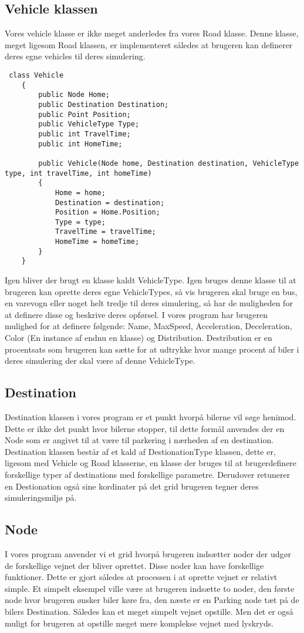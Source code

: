 \subsection{Vehicle klassen}
Vores vehicle klasse er ikke meget anderledes fra vores Road klasse. Denne klasse, meget ligesom Road klassen, er implementeret således at brugeren kan definerer deres egne vehicles til deres simulering.
\begin{lstlisting}
 class Vehicle
    {
        public Node Home;
        public Destination Destination;
        public Point Position;
        public VehicleType Type;
        public int TravelTime;
        public int HomeTime;

        public Vehicle(Node home, Destination destination, VehicleType type, int travelTime, int homeTime)
        {
            Home = home;
            Destination = destination;
            Position = Home.Position;
            Type = type;
            TravelTime = travelTime;
            HomeTime = homeTime;
        }
    }
\end{lstlisting}
Igen bliver der brugt en klasse kaldt VehicleType. Igen bruges denne klasse til at brugeren kan oprette deres egne VehicleTypes, så vis brugeren skal bruge en bus, en varevogn eller noget helt tredje til deres simulering, så har de muligheden for at definere disse og beskrive deres opførsel. I vores program har brugeren mulighed for at definere følgende: Name, MaxSpeed, Acceleration, Deceleration, Color (En instance af endnu en klasse) og Distribution. Destribution er en procentsats som brugeren kan sætte for at udtrykke hvor mange procent af biler i deres simulering der skal være af denne VehicleType.

\subsection{Destination}
Destination klassen i vores program er et punkt hvorpå bilerne vil søge henimod. Dette er ikke det punkt hvor bilerne stopper, til dette formål anvendes der en Node som er angivet til at være til parkering i nærheden af en destination. Destination klassen består af et kald af DestionationType klassen, dette er, ligesom med Vehicle og Road klasserne, en klasse der bruges til at brugerdefinere forskellige typer af destinations med forskellige parametre. Derudover retunerer en Destionation også sine kordinater på det grid brugeren tegner deres simuleringsmiljø på.

\subsection{Node}
I vores program anvender vi et grid hvorpå brugeren indsætter noder der udgør de forskellige vejnet der bliver oprettet. Disse noder kan have forskellige funktioner. Dette er gjort således at processen i at oprette vejnet er relativt simple. Et simpelt eksempel ville være at brugeren indsætte to noder, den første node hvor brugeren ønsker biler køre fra, den næste er en Parking node tæt på de bilers Destination. Således kan et meget simpelt vejnet opstille. Men det er også muligt for brugeren at opstille meget mere komplekse vejnet med lyskryds.

